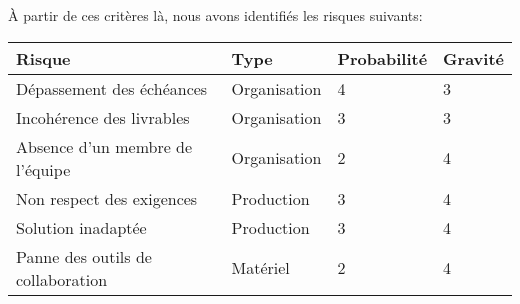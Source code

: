 À partir de ces critères là, nous avons identifiés les risques suivants:

\begin{tabular}{|l||l|l|l|}
   \hline	
	   \textbf{Risque} & \textbf{Type} & \textbf{Probabilité} & \textbf{Gravité} \\ \hline \hline
	   Dépassement des échéances         & Organisation & 4 & 3  \\ \hline
	   Incohérence des livrables         & Organisation & 3 & 3  \\ \hline
  	   Absence d'un membre de l'équipe   & Organisation & 2 & 4  \\ \hline
	   Non respect des exigences         & Production   & 3 & 4  \\ \hline
	   Solution inadaptée                & Production   & 3 & 4  \\ \hline
	   Panne des outils de collaboration & Matériel     & 2 & 4  \\
   \hline
\end{tabular}